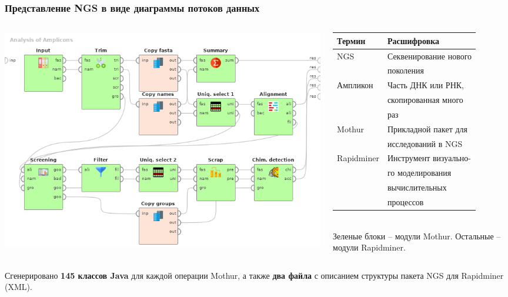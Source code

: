 \documentclass[10pt]{beamer}
\begin{document}
\begin{frame}
  \frametitle{Представление NGS в виде диаграммы потоков данных}
  \begin{columns}
    \begin{column}{0.6\textwidth}
      \begin{raggedright}
        \includegraphics[width=1\linewidth]{Dataflow-color-en.png}
      \end{raggedright}
    \end{column}
    \begin{column}{0.4\textwidth}\footnotesize
      \begin{tabular}{ll}
        Термин & Расшифровка \\
        \hline
        NGS & Секвенирование нового\\ & поколения\\
        Ампликон & Часть ДНК или РНК, \\
               & скопированная много \\
               & раз \\
        Mothur & Прикладной пакет для\\ & исследований в NGS \\
        Rapidminer & Инструмент визуально- \\
             & го моделирования \\
             & вычислительных \\
             & процессов
      \end{tabular}
      ${}$\\[1em]
      Зеленые блоки -- модули Mothur. Остальные -- модули Rapidminer.
    \end{column}
  \end{columns}
  \vspace{1em}
  Сгенерировано \textbf{145 классов Java} для каждой операции Mothur, а также \textbf{два файла} с описанием структуры пакета NGS для Rapidminer (XML).
\end{frame}
\end{document}
